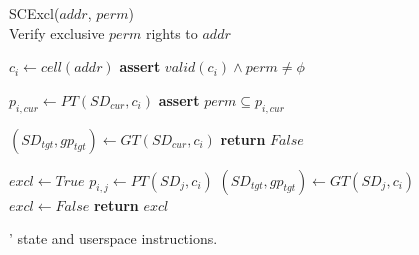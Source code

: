 \begin{figure}
\begin{multicols}{2}
    \begin{algorithm}[H]
      \caption{SCExcl($addr$, $perm$) \\
      Verify exclusive $perm$ rights to $addr$       }
      \begin{algorithmic}[1]

        \State $c_i \gets cell(addr)$
        \State \textbf{assert} $valid(c_i) \land perm \ne \phi$

        \State $p_{i,cur} \gets PT(SD_{cur}, c_i) $
        \State \textbf{assert} $perm \subseteq p_{i,cur}$

        \State $ (SD_{tgt}, gp_{tgt}) \gets GT(SD_{cur}, c_i)$
          \State \textbf{return} $False$
        \EndIf

        \State $excl \gets True$
          \State $p_{i,j} \gets PT(SD_j, c_i)$
          \State $(SD_{tgt}, gp_{tgt}) \gets GT(SD_j, c_i)$
            \State $excl \gets False$
          \EndIf
        \EndFor
        \State \textbf{return} $excl$
      \end{algorithmic}
      \label{alg:sccount}
    \end{algorithm}
    \vspace{-\baselineskip}
  \end{multicols}

  \caption[\seccells: State and userspace instructions.]
          {\seccells' state and userspace instructions.}
  \label{fig:seccell_ops_formal}
\end{figure}
